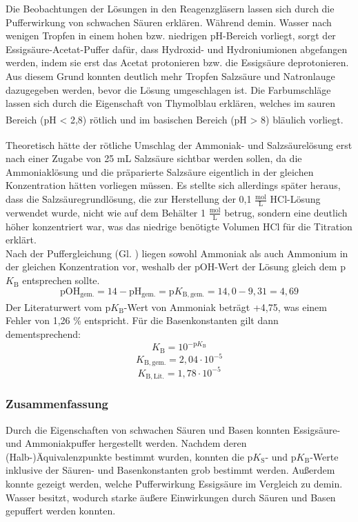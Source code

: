 \documentclass[
	a4paper,										%
	12pt,											%
	twoside,										%
	headsepline,								%
	footsepline,									%
	captions=tableheading,					%
]{scrartcl}
\newcommand{\zitat}[1]{\textsuperscript{\cite{#1}}}
\newcommand{\formel}[2]{				%
	\begin{equation}
		\label{eq: #1}							%
		#2											%
	\end{equation}}
\begin{document}
Die Beobachtungen der Lösungen in den Reagenzgläsern lassen sich durch die Pufferwirkung von schwachen Säuren erklären.
Während demin. Wasser nach wenigen Tropfen in einem hohen bzw. niedrigen pH-Bereich vorliegt,
sorgt der Essigsäure-Acetat-Puffer dafür, dass Hydroxid- und Hydroniumionen abgefangen werden,
indem sie erst das Acetat protonieren bzw. die Essigsäure deprotonieren.
Aus diesem Grund konnten deutlich mehr Tropfen Salzsäure und Natronlauge dazugegeben werden, bevor die Lösung umgeschlagen ist.
Die Farbumschläge lassen sich durch die Eigenschaft von Thymolblau erklären,
welches im sauren Bereich (pH < 2,8) rötlich und im basischen Bereich (pH > 8) bläulich vorliegt.\zitat{tb}

Theoretisch hätte der rötliche Umschlag\zitat{tb} der Ammoniak- und Salzsäurelösung erst nach einer Zugabe von 25 mL Salzsäure sichtbar werden sollen,
da die Ammoniaklösung und die präparierte Salzsäure eigentlich in der gleichen Konzentration hätten vorliegen müssen.
Es stellte sich allerdings später heraus, dass die Salzsäuregrundlösung, die zur Herstellung der 0,1 $\mathrm{\frac{mol}{L}}$ HCl-Lösung verwendet wurde,
nicht wie auf dem Behälter 1 $\mathrm{\frac{mol}{L}}$ betrug, sondern eine deutlich höher konzentriert war, was das niedrige benötigte Volumen HCl für die Titration erklärt.\\

Nach der Puffergleichung (Gl. ) liegen sowohl Ammoniak als auch Ammonium in der gleichen Konzentration vor,
weshalb der pOH-Wert der Lösung gleich dem p$K_{\mathrm{B}}$  entsprechen sollte.
\formel{b1}{\mathrm{pOH_{gem.}} = 14 - \mathrm{pH_{gem.}}= \mathrm{p}K_{\mathrm{B, gem.}} = 14,0 - 9,31 = 4,69}
Der Literaturwert\zitat{aaa} vom p$K_{\mathrm{B}}$-Wert von Ammoniak beträgt +4,75, was einem Fehler von 1,26 \% entspricht.
Für die Basenkonstanten gilt dann dementsprechend:
\formel{k1}{K_{\mathrm{B}} = 10^{-\mathrm{p}K_{\mathrm{B}}}}
\formel{k2}{K_{\mathrm{B, gem.}} = 2,04 \cdot 10^{-5}}
\formel{k3}{K_{\mathrm{B, Lit.}} = 1,78 \cdot 10^{-5}}

\subsubsection{Zusammenfassung}

Durch die Eigenschaften von schwachen Säuren und Basen konnten Essigsäure- und Ammoniakpuffer hergestellt werden.
Nachdem deren (Halb-)Äquivalenzpunkte bestimmt wurden, konnten die p$K_{\mathrm{S}}$- und p$K_{\mathrm{B}}$-Werte inklusive der Säuren- und Basenkonstanten grob bestimmt werden.
Außerdem konnte gezeigt werden, welche Pufferwirkung Essigsäure im Vergleich zu demin. Wasser besitzt,
wodurch starke äußere Einwirkungen durch Säuren und Basen gepuffert werden konnten.
\end{document}
